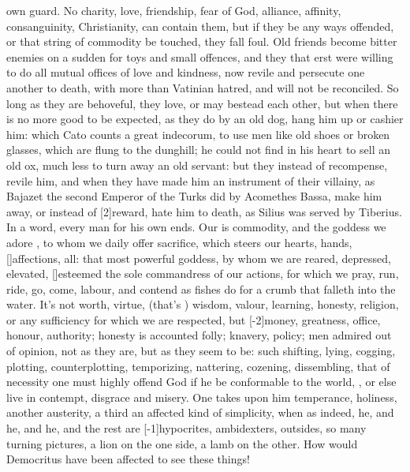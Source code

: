 {own guard. No charity, love, friendship, fear of God, alliance,
affinity, consanguinity, Christianity, can contain them, but if they be
any ways offended, or that string of commodity be touched, they fall
foul. Old friends become bitter enemies on a sudden for toys and small
offences, and they that erst were willing to do all mutual offices of
love and kindness, now revile and persecute one another to death, with
more than Vatinian hatred, and will not be reconciled. So long as they
are behoveful, they love, or may bestead each other, but when there is
no more good to be expected, as they do by an old dog, hang him up or
cashier him: which  Cato counts a great indecorum, to use men like
old shoes or broken glasses, which are flung to the dunghill; he could
not find in his heart to sell an old ox, much less to turn away an old
servant: but they instead of recompense, revile him, and when they have
made him an instrument of their villainy, as Bajazet the second
Emperor of the Turks did by Acomethes Bassa, make him away, or instead
of [2\baselineskip]reward, hate him to death, as Silius was served by Tiberius. In
a word, every man for his own ends. Our  is commodity, and
the goddess we adore , to whom we daily offer
sacrifice, which steers our hearts, hands, [\baselineskip]affections, all: that
most powerful goddess, by whom we are reared, depressed, elevated,
[\baselineskip]esteemed the sole commandress of our actions, for which we pray,
run, ride, go, come, labour, and contend as fishes do for a crumb that
falleth into the water. It's not worth, virtue, (that's ) wisdom, valour, learning, honesty, religion, or any
sufficiency for which we are respected, but [-2\baselineskip]money, greatness,
office, honour, authority; honesty is accounted folly; knavery, policy;
men admired out of opinion, not as they are, but as they seem to
be: such shifting, lying, cogging, plotting, counterplotting,
temporizing, nattering, cozening, dissembling, that of necessity
one must highly offend God if he be conformable to the world, , or else live in contempt, disgrace and misery. One takes
upon him temperance, holiness, another austerity, a third an affected
kind of simplicity, when as indeed, he, and he, and he, and the rest
are [-1\baselineskip]hypocrites, ambidexters, outsides, so many turning pictures, a
lion on the one side, a lamb on the other. How would Democritus
have been affected to see these things!

}
